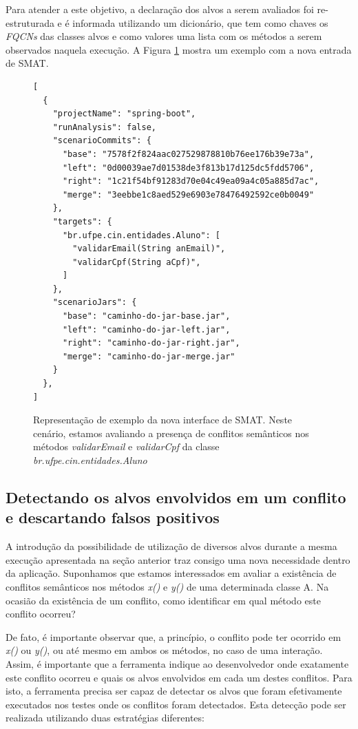 \documentclass[12pt]{article}
\begin{document}
Para atender a este objetivo, a declaração dos alvos a serem avaliados foi re-estruturada e é informada utilizando um dicionário, que tem como chaves os \textit{FQCNs} das classes alvos e como valores uma lista com os métodos a serem observados naquela execução. A Figura \ref{fig:interface-nova} mostra um exemplo com a nova entrada de SMAT.

\begin{figure}[H]
    \begin{verbatim}
[
  {
    "projectName": "spring-boot",
    "runAnalysis": false,
    "scenarioCommits": {
      "base": "7578f2f824aac027529878810b76ee176b39e73a",
      "left": "0d00039ae7d01538de3f813b17d125dc5fdd5706",
      "right": "1c21f54bf91283d70e04c49ea09a4c05a885d7ac",
      "merge": "3eebbe1c8aed529e6903e78476492592ce0b0049"
    },
    "targets": {
      "br.ufpe.cin.entidades.Aluno": [
        "validarEmail(String anEmail)",
        "validarCpf(String aCpf)",
      ]
    },
    "scenarioJars": {
      "base": "caminho-do-jar-base.jar",
      "left": "caminho-do-jar-left.jar",
      "right": "caminho-do-jar-right.jar",
      "merge": "caminho-do-jar-merge.jar"
    }
  },
]
    \end{verbatim}
    \caption{Representação de exemplo da nova interface de SMAT. Neste cenário, estamos avaliando a presença de conflitos semânticos nos métodos \textit{validarEmail} e \textit{validarCpf} da classe \textit{br.ufpe.cin.entidades.Aluno}}
    \label{fig:interface-nova}
\end{figure}

\subsection{Detectando os alvos envolvidos em um conflito e descartando falsos positivos}
A introdução da possibilidade de utilização de diversos alvos durante a mesma execução apresentada na seção anterior traz consigo uma nova necessidade dentro da aplicação. Suponhamos que estamos interessados em avaliar a existência de conflitos semânticos nos métodos \textit{x()} e \textit{y()} de uma determinada classe A. Na ocasião da existência de um conflito, como identificar em qual método este conflito ocorreu?

De fato, é importante observar que, a princípio, o conflito pode ter ocorrido em \textit{x()} ou \textit{y()}, ou até mesmo em ambos os métodos, no caso de uma interação. Assim, é importante que a ferramenta indique ao desenvolvedor onde exatamente este conflito ocorreu e quais os alvos envolvidos em cada um destes conflitos. Para isto, a ferramenta precisa ser capaz de detectar os alvos que foram efetivamente executados nos testes onde os conflitos foram detectados. Esta detecção pode ser realizada utilizando duas estratégias diferentes:
\end{document}
